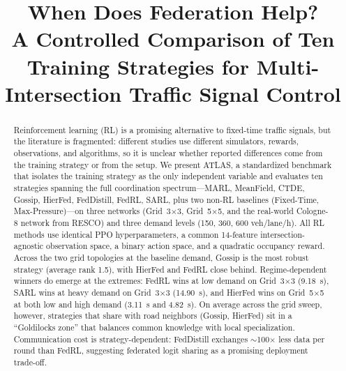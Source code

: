 \documentclass[conference]{IEEEtran}
\begin{document}
\title{When Does Federation Help?\\A Controlled Comparison of Ten Training Strategies for Multi-Intersection Traffic Signal Control}

\author{
\and
{}
\and
{}
\and
{}
\and
{}
}

\maketitle

\begin{abstract}
Reinforcement learning (RL) is a promising alternative to fixed-time traffic signals, but the literature is fragmented: different studies use different simulators, rewards, observations, and algorithms, so it is unclear whether reported differences come from the training strategy or from the setup. We present ATLAS, a standardized benchmark that isolates the training strategy as the only independent variable and evaluates ten strategies spanning the full coordination spectrum---MARL, MeanField, CTDE, Gossip, HierFed, FedDistill, FedRL, SARL, plus two non-RL baselines (Fixed-Time, Max-Pressure)---on three networks (Grid~3$\times$3, Grid~5$\times$5, and the real-world Cologne-8 network from RESCO) and three demand levels (150, 360, 600 veh/lane/h). All RL methods use identical PPO hyperparameters, a common 14-feature intersection-agnostic observation space, a binary action space, and a quadratic occupancy reward. Across the two grid topologies at the baseline demand, Gossip is the most robust strategy (average rank 1.5), with HierFed and FedRL close behind. Regime-dependent winners do emerge at the extremes: FedRL wins at low demand on Grid~3$\times$3 (9.18~s), SARL wins at heavy demand on Grid~3$\times$3 (14.90~s), and HierFed wins on Grid~5$\times$5 at both low and high demand (3.11~s and 4.82~s). On average across the grid sweep, however, strategies that share with road neighbors (Gossip, HierFed) sit in a ``Goldilocks zone'' that balances common knowledge with local specialization. Communication cost is strategy-dependent: FedDistill exchanges $\sim$100$\times$ less data per round than FedRL, suggesting federated logit sharing as a promising deployment trade-off.
\end{abstract}
\end{document}
